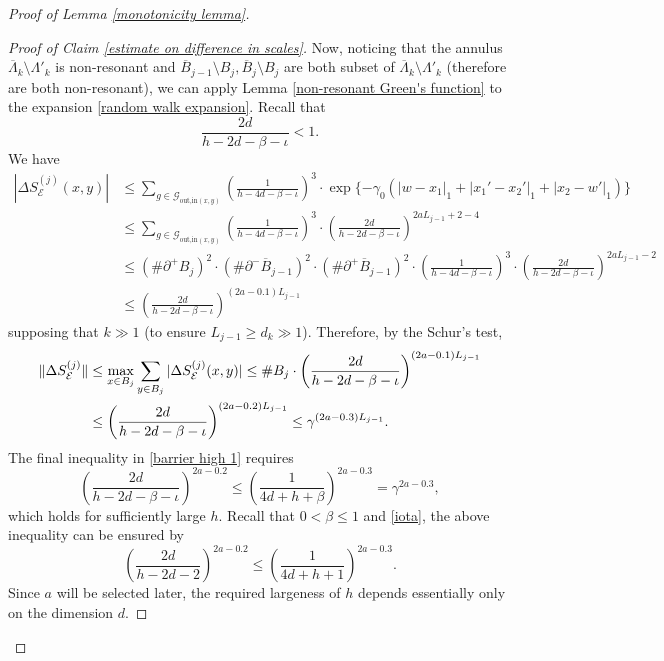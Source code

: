 \documentclass[11pt,reqno,UTF8,twoside]{amsart}
\newcommand{\barLambda}{\overline{\Lambda}}
\newcommand{\mcE}{\mathcal{E}}
\newcommand{\mcG}{\mathcal{G}}
\newcommand{\barB}{\overline{B}}
\newcommand{\diffSj}{\Delta {S}^{(j)}}
\theoremstyle{definition}
\numberwithin{equation}{section}
\begin{document}
\begin{proof}[Proof of Lemma \ref{monotonicity lemma}]
\begin{proof}[Proof of Claim \ref{estimate on difference in scales}]
  Now, noticing that the annulus $\barLambda_k\setminus \Lambda'_k$ is non-resonant and $\barB_{j-1}\setminus B_{j},\barB_{j}\setminus B_{j}$ are both subset of $\barLambda_k\setminus \Lambda'_k$ (therefore are both non-resonant), we can apply Lemma \ref{non-resonant Green's function} to the expansion \eqref{random walk expansion}. Recall that 
  \[\frac{2d}{h-2d-\beta-\iota}<1.\]
  We have 
  \begin{align*}
    |\diffSj_\mcE (x,y)| & \leq \sum_{g\in \mcG_{\text{out,in}(x,y)}} \left(\frac{1}{h-4d-\beta-\iota}\right)^3 \cdot \exp\{-\gamma_0 (|w-x_1|_1+|x_1'-x_2'|_1 +|x_2-w'|_1)\} \\
        & \leq \sum_{g\in \mcG_{\text{out,in}(x,y)}} \left(\frac{1}{h-4d-\beta-\iota}\right)^3 \cdot  \left(\frac{2d}{h-2d-\beta-\iota}\right)^{2aL_{j-1}+2-4} \\
        & \leq (\# \partial^+B_j)^2\cdot (\# \partial^-\barB_{j-1})^2 \cdot (\# \partial^+ \barB_{j-1})^2\cdot \left(\frac{1}{h-4d-\beta-\iota}\right)^3 \cdot \left(\frac{2d}{h-2d-\beta-\iota}\right)^{2aL_{j-1}-2}  \\
        & \leq \left(\frac{2d}{h-2d-\beta-\iota}\right)^{(2a-0.1)L_{j-1}} 
  \end{align*}  
  supposing that $k\gg1$  (to ensure $L_{j-1}\geq d_k\gg1$). Therefore,  by the  Schur's  test, 
  \begin{align}\label{barrier high 1}
  \notag  \| \diffSj_\mcE \| & \leq \max_{x\in B_j} \sum_{y\in B_j} |\diffSj_\mcE (x,y)| \leq \# B_j \cdot \left(\frac{2d}{h-2d-\beta-\iota}\right)^{(2a-0.1)L_{j-1}}\\
            &\leq \left(\frac{2d}{h-2d-\beta-\iota}\right)^{(2a-0.2)L_{j-1}} \leq \gamma^{(2a-0.3)L_{j-1}}.
  \end{align}
  The final inequality in \eqref{barrier high 1} requires
  \[\left(\frac{2d}{h-2d-\beta-\iota}\right)^{2a-0.2} \leq \left(\frac{1}{4d+h+\beta}\right)^{2a-0.3} =\gamma^{2a-0.3},\]
  which holds for  sufficiently large  $h$. Recall that $0<\beta\leq 1$ and \eqref{iota}, the above inequality can be ensured by 
  \begin{equation}\label{essential barrier high 1}
      \left(\frac{2d}{h-2d-2}\right)^{2a-0.2} \leq \left(\frac{1}{4d+h+1}\right)^{2a-0.3} .
  \end{equation}
  Since $a$ will be selected later, the required largeness of $h$ depends essentially only on the dimension $d$.
\end{proof}


\end{proof}
\end{document}
